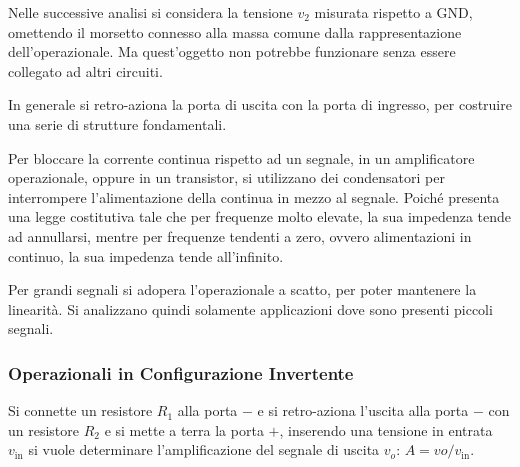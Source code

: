 \documentclass{article}
\numberwithin{equation}{subsection}
\begin{document}
Nelle successive analisi si considera la tensione $v_2$ misurata rispetto a GND, omettendo il morsetto connesso alla massa comune dalla rappresentazione 
dell'operazionale. Ma quest'oggetto non potrebbe funzionare senza essere collegato ad altri circuiti. 

In generale si retro-aziona la porta di uscita con la porta di ingresso, per costruire una serie di strutture fondamentali. 

Per bloccare la corrente continua rispetto ad un segnale, in un amplificatore operazionale, oppure in un transistor, si utilizzano dei condensatori per 
interrompere l'alimentazione della continua in mezzo al segnale. Poiché presenta una legge costitutiva tale che per frequenze molto elevate, la 
sua impedenza tende ad annullarsi, mentre per frequenze tendenti a zero, ovvero alimentazioni in continuo, la sua impedenza tende all'infinito. 

Per grandi segnali si adopera l'operazionale a scatto, per poter mantenere la linearità. Si analizzano quindi solamente applicazioni dove sono 
presenti piccoli segnali. 

\subsubsection{Operazionali in Configurazione Invertente}
\label{sec:amplificatore}
Si connette un resistore $R_1$ alla porta $-$ e si retro-aziona l'uscita alla porta $-$ con un resistore $R_2$ e si mette a terra la porta $+$, 
inserendo una tensione in entrata $v_\mathrm{in}$ si vuole determinare l'amplificazione del segnale di uscita $v_o$: $A=vo/v_\mathrm{in}$. 
\end{document}

